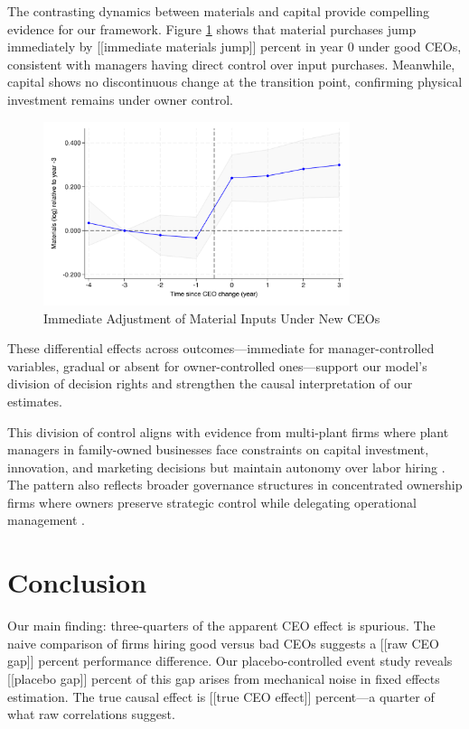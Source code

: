\documentclass[11pt,a4paper]{article}
\begin{document}
The contrasting dynamics between materials and capital provide compelling evidence for our framework. Figure \ref{fig:materials} shows that material purchases jump immediately by [[immediate materials jump]] percent in year 0 under good CEOs, consistent with managers having direct control over input purchases. Meanwhile, capital shows no discontinuous change at the transition point, confirming physical investment remains under owner control.

\begin{figure}[htbp]
\centering
\includegraphics[width=0.8\textwidth]{figure/event_study_lnM.pdf}
\caption{Immediate Adjustment of Material Inputs Under New CEOs}
\label{fig:materials}
\end{figure}

These differential effects across outcomes—immediate for manager-controlled variables, gradual or absent for owner-controlled ones—support our model's division of decision rights and strengthen the causal interpretation of our estimates.

This division of control aligns with evidence from multi-plant firms where plant managers in family-owned businesses face constraints on capital investment, innovation, and marketing decisions but maintain autonomy over labor hiring \citep{bloom2012americans}. The pattern also reflects broader governance structures in concentrated ownership firms where owners preserve strategic control while delegating operational management \citep{zellweger2012managing}.

\section{Conclusion}

Our main finding: three-quarters of the apparent CEO effect is spurious. The naive comparison of firms hiring good versus bad CEOs suggests a [[raw CEO gap]] percent performance difference. Our placebo-controlled event study reveals [[placebo gap]] percent of this gap arises from mechanical noise in fixed effects estimation. The true causal effect is [[true CEO effect]] percent—a quarter of what raw correlations suggest.
\end{document}
